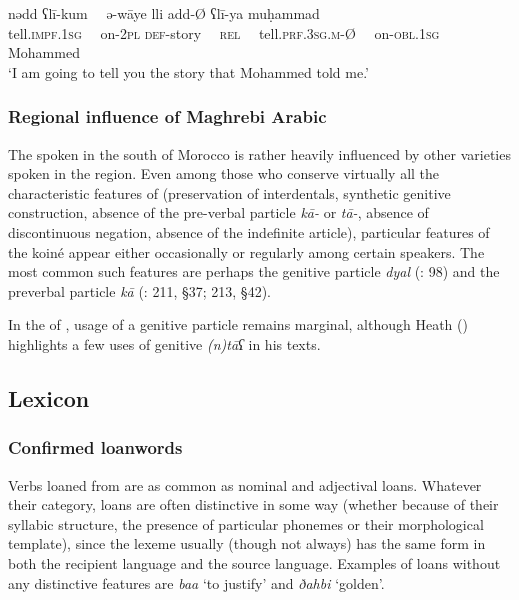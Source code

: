 \documentclass[output=paper]{langsci/langscibook}
\begin{document}
\ea
\gll n{\R}ədd ʕlī-kum~~ ə{\R}-{\R}wāye lli {\R}add-Ø ʕlī-ya muḥammad\\
 tell.\textsc{impf.}1\textsc{sg}~~ on-2\textsc{pl} \textsc{def-}story~~ \textsc{rel}~~ tell.\textsc{prf.3sg.m-}Ø~~ on-\textsc{obl.1sg} Mohammed\\
\glt ‘I am going to tell you the story that Mohammed told me.’ 
\z

\subsubsection{Regional influence of Maghrebi Arabic} %

The  spoken in the south of Morocco is rather heavily influenced by other  varieties spoken in the region. Even among those who conserve virtually all the characteristic features of  (preservation of interdentals, synthetic genitive construction, absence of the pre-verbal particle \textit{kā-} or \textit{tā-}, absence of discontinuous {negation}, absence of the {indefinite article}), particular features of the   koiné appear either occasionally or regularly among certain speakers. The most common such features are perhaps the genitive particle \textit{dyal} (\citealt{Taine-Cheikh1997socio}: 98) and the preverbal particle \textit{kā} (\citealt{Aguadé1998}: 211, §37; 213, §42).

In the  of , usage of a genitive particle remains marginal, although Heath (\citeyear[162]{Heath2004}) highlights a few uses of genitive \textit{(n)tāʕ} in his texts.

\subsection{Lexicon} %

\subsubsection{Confirmed loanwords} %


Verbs loaned from   are as common as nominal and adjectival loans. Whatever their category, loans are often distinctive in some way (whether because of their {syllabic structure}, the presence of particular phonemes or their morphological template), since the lexeme usually (though not always) has the same form in both the {recipient language} and the {source language}. Examples of loans without any distinctive features are \textit{ba{\R}{\R}a{\R}} ‘to justify’ and \textit{ðahbi} ‘golden’. 
\end{document}
